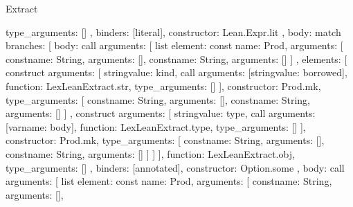 \begin{lexlean}{Extract}
\begin{toolingmodule}
{{{{{              type_arguments: []
            },
            binders: [literal],
            constructor: Lean.Expr.lit
          },
          {
            body: match{
              branches: [
                {
                  body: call{
                    arguments: [
                      list{
                        element: const{
                          name: Prod,
                          arguments: [
                            const{name: String, arguments: []},
                            const{name: String, arguments: []}
                          ]
                        },
                        elements: [
                          construct{
                            arguments: [
                              string{value: kind},
                              call{
                                arguments: [string{value: borrowed}],
                                function: LexLeanExtract.str,
                                type_arguments: []
                              }
                            ],
                            constructor: Prod.mk,
                            type_arguments: [
                              const{name: String, arguments: []},
                              const{name: String, arguments: []}
                            ]
                          },
                          construct{
                            arguments: [
                              string{value: type},
                              call{
                                arguments: [var{name: body}],
                                function: LexLeanExtract.type,
                                type_arguments: []
                              }
                            ],
                            constructor: Prod.mk,
                            type_arguments: [
                              const{name: String, arguments: []},
                              const{name: String, arguments: []}
                            ]
                          }
                        ]
                      }
                    ],
                    function: LexLeanExtract.obj,
                    type_arguments: []
                  },
                  binders: [annotated],
                  constructor: Option.some
                },
                {
                  body: call{
                    arguments: [
                      list{
                        element: const{
                          name: Prod,
                          arguments: [
                            const{name: String, arguments: []},
}}}}}}}}}
\end{toolingmodule}
\end{lexlean}
